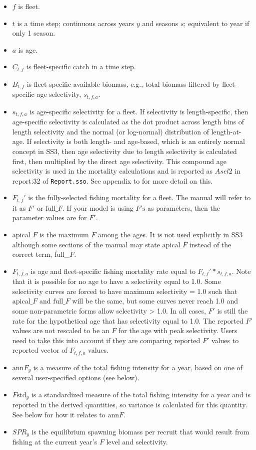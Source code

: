 \begin{itemize}
	\item $f$ is fleet.
	\item $t$ is a time step; continuous across years $y$ and seasons $s$; equivalent to year if only 1 season.
	\item $a$ is age.
	\item $C_{t,f}$ is fleet-specific catch in a time step.
	\item $B_{t,f}$ is fleet specific available biomass, e.g., total biomass filtered by fleet-specific age selectivity, $s_{t,f,a}$.
	\item $s_{t,f,a}$ is age-specific selectivity for a fleet. If selectivity is length-specific, then age-specific selectivity is calculated as the dot product across length bins of length selectivity and the normal (or log-normal) distribution of length-at-age. If selectivity is both length- and age-based, which is an entirely normal concept in SS3, then age selectivity due to length selectivity is calculated first, then multiplied by the direct age selectivity. This compound age selectivity is used in the mortality calculations and is reported as $Asel2$ in report:32 of \texttt{Report.sso}. See appendix to \citet{methotstock2013} for more detail on this.
	\item $F_{t,f}'$ is the fully-selected fishing mortality for a fleet. The manual will refer to it as $F'$ or $\text{full\_}F$. If your model is using $F'\text{s}$ as parameters, then the parameter values are for $F'$.
	\item $\text{apical\_}F$ is the maximum $F$ among the ages. It is not used explicitly in SS3 although some sections of the manual may state $\text{apical\_}F$ instead of the correct term, full\_$F$.
	\item $F_{t,f,a}$ is age and fleet-specific fishing mortality rate equal to $F_{t,f}' * s_{t,f,a}$. Note that it is possible for no age to have a selectivity equal to 1.0. Some selectivity curves are forced to have maximum selectivity = 1.0 such that $\text{apical\_}F$ and $\text{full\_}F$ will be the same, but some curves never reach 1.0 and some non-parametric forms allow selectivity > 1.0. In all cases, $F'$ is still the rate for the hypothetical age that has selectivity equal to 1.0. The reported $F'$ values are not rescaled to be an $F$ for the age with peak selectivity. Users need to take this into account if they are comparing reported $F'$ values to reported vector of $F_{t,f,a}$ values.
	\item $\text{ann}F_y$ is a measure of the total fishing intensity for a year, based on one of several user-specified options (see below).
	\item $F\text{std}_y$ is a standardized measure of the total fishing intensity for a year and is reported in the derived quantities, so variance is calculated for this quantity. See below for how it relates to $\text{ann}F$.
	\item $SPR_y$ is the equilibrium spawning biomass per recruit that would result from fishing at the current year's $F$ level and selectivity.
\end{itemize}

